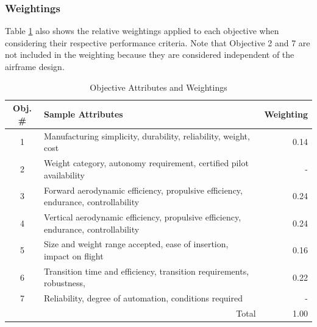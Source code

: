 



\subsubsection{Weightings}

Table \ref{tab:objective-attributes-weightings} also shows the relative weightings applied to each objective when considering their respective performance criteria. Note that Objective 2 and 7 are not included in the weighting because they are considered independent of the airframe design.

\begin{table}[H]
\caption{Objective Attributes and Weightings}
\label{tab:objective-attributes-weightings}
\centering
\begin{tabular}{|c|p{10cm}|r|}
\hline
\multicolumn{1}{|c|}{\textbf{Obj. \#}}     & \textbf{Sample Attributes}           & \multicolumn{1}{c|}{\textbf{Weighting}} \\\hline
1 & Manufacturing simplicity, durability, reliability, weight, cost                                     & 0.14                                   \\\hline
2 &  Weight category, autonomy requirement, certified pilot availability & -                                      \\\hline
3 &  Forward aerodynamic efficiency, propulsive efficiency, endurance, controllability & 0.24                                   \\\hline
4 &  Vertical aerodynamic efficiency, propulsive efficiency, endurance, controllability                                      & 0.24                                   \\\hline
5 &  Size and weight range accepted, ease of insertion, impact on flight                                  & 0.16                                   \\\hline
6 &  Transition time and efficiency, transition requirements, robustness,                               & 0.22                                   \\\hline
7 &  Reliability, degree of automation, conditions required                         & -                                      \\\hline
 \multicolumn{1}{|c}{}   &        \multicolumn{1}{r|}{Total}                       & 1.00                                     \\\hline
\end{tabular}
\end{table}

